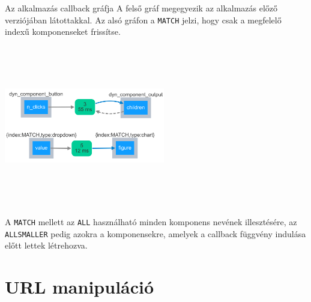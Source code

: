\documentclass[english, aspectratio=169]{beamer}
\makeatletter
\let\origtableofcontents=\tableofcontents
\def\tableofcontents{\@ifnextchar[{\origtableofcontents}{\gobbletableofcontents}}
\def\gobbletableofcontents#1{\origtableofcontents}
\makeatother
\begin{document}
	\begin{frame}{Az alkalmazás callback gráfja}
		A felső gráf megegyezik az alkalmazás előző verziójában látottakkal. Az alsó gráfon a \texttt{MATCH} jelzi, hogy csak a megfelelő indexű komponenseket frissítse.\par\medskip
		\begin{center}
			\includegraphics[width=7cm, height=7cm, keepaspectratio]{images/adv_4.png}
		\end{center}
		\par\medskip
		A \texttt{MATCH} mellett az \texttt{ALL} használható minden komponens nevének illesztésére, az \texttt{ALLSMALLER} pedig azokra a komponensekre, amelyek a callback függvény indulása előtt lettek létrehozva.
	\end{frame}
	
	\section{URL manipuláció}
	
	\begin{frame}
		\tableofcontents[currentsection]
	\end{frame}
	
\end{document}
